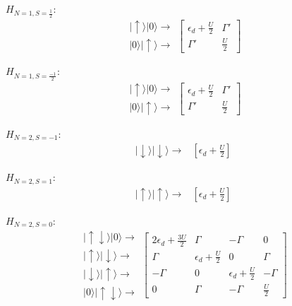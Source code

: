 \begin{multicols}{2}

$H_{N=1,S=\frac{1}{2}}:$
\[
\begin{array}{c}
\vert\uparrow\rangle\vert0\rangle\rightarrow\\
\vert0\rangle\vert\uparrow\rangle\rightarrow
\end{array}\left[\begin{array}{cc}
\epsilon_{d}+\frac{U}{2} & \Gamma'\\
\Gamma' & \frac{U}{2}
\end{array}\right]
\]


$H_{N=1,S=\frac{-1}{2}}:$
\[
\begin{array}{c}
\vert\uparrow\rangle\vert0\rangle\rightarrow\\
\vert0\rangle\vert\uparrow\rangle\rightarrow
\end{array}\left[\begin{array}{cc}
\epsilon_{d}+\frac{U}{2} & \Gamma'\\
\Gamma' & \frac{U}{2}
\end{array}\right]
\]


\end{multicols}

\begin{multicols}{2}

$H_{N=2,S=-1}:$
\[
\begin{array}{c}
\vert\downarrow\rangle\vert\downarrow\rangle\rightarrow\end{array}\begin{array}{c}
\left[\epsilon_{d}+\frac{U}{2}\right]\end{array}
\]


$H_{N=2,S=1}:$
\[
\begin{array}{c}
\vert\uparrow\rangle\vert\uparrow\rangle\rightarrow\end{array}\begin{array}{c}
\left[\epsilon_{d}+\frac{U}{2}\right]\end{array}
\]


\end{multicols}

$H_{N=2,S=0}:$
\[
\begin{array}{c}
\vert\uparrow\!\downarrow\rangle\vert0\rangle\rightarrow\\
\vert\uparrow\rangle\vert\downarrow\rangle\rightarrow\\
\vert\downarrow\rangle\vert\uparrow\rangle\rightarrow\\
\vert0\rangle\vert\uparrow\!\downarrow\rangle\rightarrow
\end{array}\left[\begin{array}{cccc}
2\epsilon_{d}+\frac{3U}{2} & \Gamma & -\Gamma & 0\\
\Gamma & \epsilon_{d}+\frac{U}{2} & 0 & \Gamma\\
-\Gamma & 0 & \epsilon_{d}+\frac{U}{2} & -\Gamma\\
0 & \Gamma & -\Gamma & \frac{U}{2}
\end{array}\right]
\]


